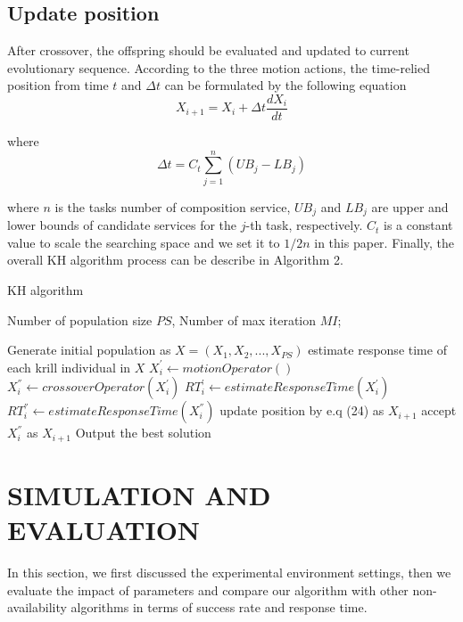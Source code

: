 \documentclass[journal]{IEEEtran}
\begin{document}
\subsection{Update position}
After crossover, the offspring should be evaluated and updated to current evolutionary sequence.
According to the three motion actions, the time-relied position from time $t$ and $\Delta t$ can be formulated by the following equation
\begin{equation}
X_{i+1} = X_i + \Delta t \frac{dX_i}{dt}
\end{equation}

where
\begin{equation}
\Delta t = C_t\sum_{j=1}^{n}(UB_j - LB_j)
\end{equation}

where $n$ is the tasks number of composition service, $UB_j$ and $LB_j$ are upper and lower bounds of candidate services for the $j$-th task, respectively. $C_t$ is a constant value to scale the searching space and we set it to $1/2n$ in this paper. Finally, the overall KH algorithm process can be describe in Algorithm 2.

\begin{algorithm}
\caption{KH algorithm}
\label{alg2}
\begin{algorithmic}[1]

\REQUIRE Number of population size $PS$, Number of max iteration $MI$;

\STATE Generate initial population as $X = (X_1, X_2, ..., X_{PS})$
\STATE estimate response time of each krill individual in $X$
    \STATE $X_i^{'} \leftarrow motionOperator()$
    \STATE $X_i^{''} \leftarrow crossoverOperator(X_i^{'})$
    \STATE $RT_i^{'} \leftarrow estimateResponseTime(X_i^{'})$
    \STATE $RT_i^{''} \leftarrow estimateResponseTime(X_i^{''})$
      \STATE update position by e.q (24) as $X_{i+1}$
    \ELSE
      \STATE accept $X_i^{''}$ as $X_{i+1}$
    \ENDIF
  \ENDFOR
\ENDFOR
\STATE Output the best solution
\end{algorithmic}
\end{algorithm}


\section{SIMULATION AND EVALUATION}
In this section, we first discussed the experimental environment settings, then we evaluate the impact of parameters and compare our algorithm with other non-availability algorithms in terms of success rate and response time.
\end{document}
